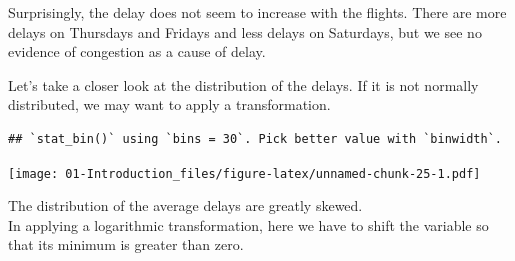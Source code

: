 \documentclass[]{book}
\newenvironment{Shaded}{\begin{snugshade}}{\end{snugshade}}
\newcommand{\KeywordTok}[1]{\textcolor[rgb]{0.13,0.29,0.53}{\textbf{{#1}}}}
\newcommand{\DataTypeTok}[1]{\textcolor[rgb]{0.13,0.29,0.53}{{#1}}}
\newcommand{\DecValTok}[1]{\textcolor[rgb]{0.00,0.00,0.81}{{#1}}}
\newcommand{\StringTok}[1]{\textcolor[rgb]{0.31,0.60,0.02}{{#1}}}
\newcommand{\CommentTok}[1]{\textcolor[rgb]{0.56,0.35,0.01}{\textit{{#1}}}}
\newcommand{\OtherTok}[1]{\textcolor[rgb]{0.56,0.35,0.01}{{#1}}}
\newcommand{\NormalTok}[1]{{#1}}
\theoremstyle{definition}
\theoremstyle{definition}
\theoremstyle{remark}
\begin{document}
Surprisingly, the delay does not seem to increase with the flights.
There are more delays on Thursdays and Fridays and less delays on
Saturdays, but we see no evidence of congestion as a cause of delay.

Let's take a closer look at the distribution of the delays. If it is not
normally distributed, we may want to apply a transformation.

\begin{Shaded}
\end{Shaded}

\begin{verbatim}
## `stat_bin()` using `bins = 30`. Pick better value with `binwidth`.
\end{verbatim}

\texttt{[image: 01-Introduction\_files/figure-latex/unnamed-chunk-25-1.pdf]}

The distribution of the average delays are greatly skewed.\\
In applying a logarithmic transformation, here we have to shift the
variable so that its minimum is greater than zero.

\begin{Shaded}
\end{Shaded}
\end{document}
